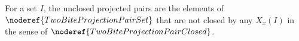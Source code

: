 \begin{definition}
For a set \(I\), the unclosed projected pairs are the elements of
\(\noderef{TwoBiteProjectionPairSet}\) that are not closed by any
\(X_x(I)\) in the sense of \(\noderef{TwoBiteProjectionPairClosed}\).
\end{definition}
